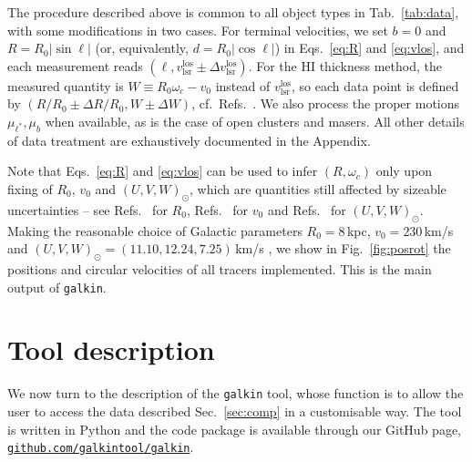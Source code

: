 \documentclass[twocolumn,prd,reprint,preprintnumbers,amsmath,amssymb,superscriptaddress,nofootinbib]{revtex4}
\begin{document}
The procedure described above is common to all object types in Tab.~\ref{tab:data}, with some modifications in two cases. For terminal velocities, we set $b=0$ and $R=R_0|\sin\ell|$ (or, equivalently, $d=R_0|\cos\ell|$) in Eqs.~\eqref{eq:R} and \eqref{eq:vlos}, and each measurement reads $(\ell,v_{\textrm{lsr}}^{\textrm{los}} \pm \Delta v_{\textrm{lsr}}^{\textrm{los}})$. For the HI thickness method, the measured quantity is $W\equiv R_0\omega_c -v_0$ instead of $v_{\textrm{lsr}}^{\textrm{los}}$, so each data point is defined by $(R/R_0 \pm \Delta R/R_0, W \pm \Delta W)$, cf.~Refs.~\cite{1992AJ....103.1552M,HonmaSofue1997}. We also process the proper motions $\mu_{\ell^\ast},\mu_b$ when available, as is the case of open clusters and masers. All other details of data treatment are exhaustively documented in the Appendix.





\par Note that Eqs.~\eqref{eq:R} and \eqref{eq:vlos} can be used to infer $(R,\omega_c)$ only upon fixing of $R_0$, $v_0$ and $(U,V,W)_{\odot}$, which are quantities still affected by sizeable uncertainties -- see Refs.~\cite{Gillessen2009,Ando2011,Malkin2012,Reid2014} for $R_0$, Refs.~\cite{ReidBrunthaler2004,Reid2009,Bovy2009, McMillan2010, Bovy2012,Reid2014} for $v_0$ and Refs.~\cite{DehnenBinney1998,Schoenrich2010,Bovy2012,Reid2014} for $(U,V,W)_{\odot}$. Making the reasonable choice of Galactic parameters $R_0=8\,$kpc, $v_0=230\,$km/s and $(U,V,W)_{\odot}=(11.10,12.24,7.25)\,$km/s \cite{Schoenrich2010}, we show in Fig.~\ref{fig:posrot} the positions and circular velocities of all tracers implemented. This is the main output of \texttt{galkin}.








\section{Tool description}\label{sec:tool}
\par We now turn to the description of the \texttt{galkin} tool, whose function is to allow the user to access the data described Sec.~\ref{sec:comp} in a customisable way. The tool is written in Python and the code package is available through our GitHub page, \href{https://github.com/galkintool/galkin}{\tt github.com/galkintool/galkin}.
\end{document}
